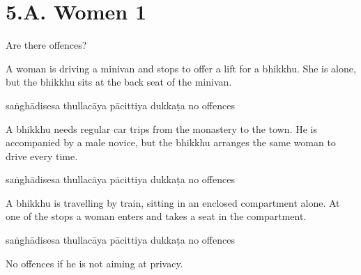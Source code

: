 \chapter{5.A. Women 1}
\renewcommand*{\theChapterTitle}{5.A. Women 1}

\begin{exam}{\autoExamName}

\begin{problem*}

Are there offences?

\begin{parts}

\item A woman is driving a minivan and stops to offer a lift for a bhikkhu.
  She is alone, but the bhikkhu sits at the back seat of the minivan.

  \bigskip

  \begin{answers}{5}
    \bChoices
     saṅghādisesa\eAns
     thullacāya\eAns
     pācittiya\eAns
     dukkaṭa\eAns
     no offences\eAns
    \eChoices
  \end{answers}

  \bigskip

\item A bhikkhu needs regular car trips from the monastery to the town. He is
  accompanied by a male novice, but the bhikkhu arranges the same woman to drive
  every time.

  \bigskip

  \begin{answers}{5}
    \bChoices
     saṅghādisesa\eAns
     thullacāya\eAns
     pācittiya\eAns
     dukkaṭa\eAns
     no offences\eAns
    \eChoices
  \end{answers}

  \bigskip

\item A bhikkhu is travelling by train, sitting in an enclosed compartment alone.
  At one of the stops a woman enters and takes a seat in the compartment.

  \bigskip

  \begin{answers}{5}
    \bChoices
     saṅghādisesa\eAns
     thullacāya\eAns
     pācittiya\eAns
     dukkaṭa\eAns
     no offences\eAns
    \eChoices
  \end{answers}

  \begin{solution}
    No offences if he is not aiming at privacy.
  \end{solution}


\end{parts}
\end{problem*}
\end{exam}
